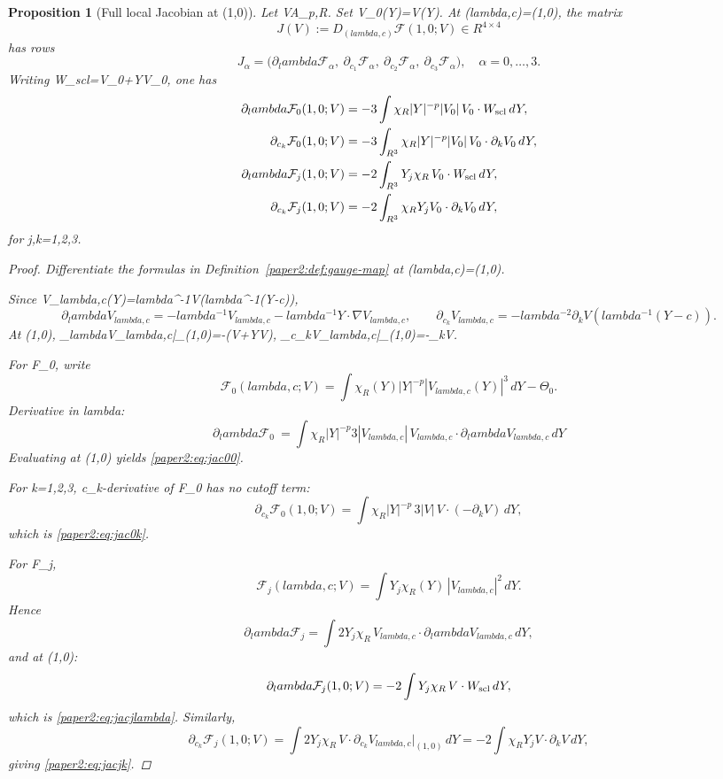 \documentclass[11pt]{amsart}
\def\({}%
\def\){}%
\def\mathrm#1{#1}%
\def\mathbb#1{#1}%
\def\lambda{lambda}%
\theoremstyle{plain}
\newtheorem{proposition}[theorem]{Proposition}
\theoremstyle{definition}
\theoremstyle{remark}
\newcommand{\dd}{\mathrm d}
\newcommand{\RR}{\mathbb R}
\newcommand{\nn}{\nabla}
\begin{document}
\begin{proposition}[Full local Jacobian at \((1,0)\)]\label{paper2:prop:full-jacobian}
Let \(V\in\mathcal A_{p,R}\).
Set \(V_0(Y)=V(Y)\).
At \((\lambda,c)=(1,0)\), the matrix
\[
J(V):=D_{(\lambda,c)}\mathcal F(1,0;V)\in \RR^{4\times4}
\]
has rows
\[
J_\alpha=\bigl(\partial_\lambda \mathcal F_\alpha,\ \partial_{c_1}\mathcal F_\alpha,\ 
\partial_{c_2}\mathcal F_\alpha,\ \partial_{c_3}\mathcal F_\alpha\bigr),\quad \alpha=0,\dots,3.
\]
Writing \(W_{\rm scl}=V_0+Y\cdot\nn V_0\), one has
\begin{align}
\partial_\lambda \mathcal F_0(1,0;V)
&=
-3\int\chi_R|Y|^{-p}|V_0|\,V_0\cdot W_{\rm scl}\,\dd Y,\label{paper2:eq:jac00}\\
\partial_{c_k}\mathcal F_0(1,0;V)
&=-3\int_{\RR^3}\chi_R |Y|^{-p}|V_0|\,V_0\cdot\partial_kV_0\,\dd Y,\label{paper2:eq:jac0k}\\
\partial_\lambda \mathcal F_j(1,0;V)
&=-2\int_{\RR^3}Y_j\chi_R\,V_0\cdot W_{\rm scl}\,\dd Y,\label{paper2:eq:jacjlambda}\\
\partial_{c_k}\mathcal F_j(1,0;V)
&=-2\int_{\RR^3}\chi_R Y_j V_0\cdot\partial_kV_0\,\dd Y,\label{paper2:eq:jacjk}
\end{align}
for \(j,k=1,2,3\).
\begin{proof}
Differentiate the formulas in Definition~\ref{paper2:def:gauge-map} at \((\lambda,c)=(1,0)\).

Since \(V_{\lambda,c}(Y)=\lambda^{-1}V(\lambda^{-1}(Y-c))\),
\[
\partial_\lambda V_{\lambda,c}
 =-\lambda^{-1}V_{\lambda,c}-\lambda^{-1}Y\cdot\nabla V_{\lambda,c},\qquad
\partial_{c_k}V_{\lambda,c}=-\lambda^{-2}\partial_kV(\lambda^{-1}(Y-c)).
\]
At \((1,0)\), \(\partial_\lambda V_{\lambda,c}|_{(1,0)}=-(V+Y\cdot\nabla V)\),
\(\partial_{c_k}V_{\lambda,c}|_{(1,0)}=-\partial_kV\).

For \(\mathcal F_0\), write
\[
\mathcal F_0(\lambda,c;V)=\int \chi_R(Y)|Y|^{-p}|V_{\lambda,c}(Y)|^3\,dY-\Theta_0.
\]
Derivative in \(\lambda\):
\[
\partial_\lambda \mathcal F_0
\ =\int\chi_R|Y|^{-p}3|V_{\lambda,c}|\,V_{\lambda,c}\cdot\partial_\lambda V_{\lambda,c}\,dY
\]
Evaluating at \((1,0)\) yields \eqref{paper2:eq:jac00}.

For \(k=1,2,3\), \(c_k\)-derivative of \(\mathcal F_0\) has no cutoff term:
\[
\partial_{c_k}\mathcal F_0(1,0;V)
=\int \chi_R|Y|^{-p}\,3|V|\,V\cdot(-\partial_kV)\,dY,
\]
which is \eqref{paper2:eq:jac0k}.

For \(\mathcal F_j\),
\[
\mathcal F_j(\lambda,c;V)=\int Y_j\chi_R(Y)\,|V_{\lambda,c}|^2\,dY.
\]
Hence
\[
\partial_\lambda \mathcal F_j
=\int 2Y_j\chi_R\,V_{\lambda,c}\cdot\partial_\lambda V_{\lambda,c}\,dY,
\]
and at \((1,0)\):
\[
\partial_\lambda \mathcal F_j(1,0;V)
=-2\int Y_j\chi_R\,V\cdot W_{\rm scl}\,dY,
\]
which is \eqref{paper2:eq:jacjlambda}. Similarly,
\[
\partial_{c_k}\mathcal F_j(1,0;V)
=\int 2Y_j\chi_R\,V\cdot\partial_{c_k}V_{\lambda,c}\big|_{(1,0)}\,dY
=-2\int \chi_RY_jV\cdot\partial_kV\,dY,
\]
giving \eqref{paper2:eq:jacjk}.
\end{proof}
\end{proposition}
\end{document}
